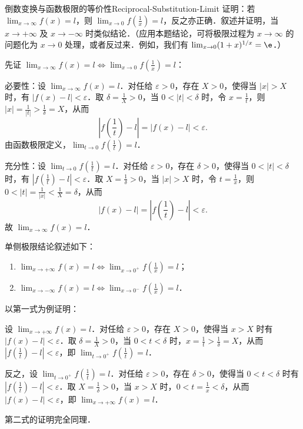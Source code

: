 \begin{problem}{倒数变换与函数极限的等价性}{Reciprocal-Substitution-Limit}
    证明：若 $\lim_{x\to\infty} f(x) = l$，则 $\lim_{x\to 0} f\left(\frac{1}{x}\right) = l$，反之亦正确．叙述并证明，当 $x \to +\infty$ 及 $x \to -\infty$ 时类似结论．（应用本题结论，可将极限过程为 $x \to \infty$ 的问题化为 $x \to 0$ 处理，或者反过来．例如，我们有 $\lim_{x\to 0}(1+x)^{1/x} = \e$．）
\end{problem}

\begin{myproof}
    先证 $\lim_{x\to\infty} f(x) = l \iff \lim_{x\to 0} f\left(\frac{1}{x}\right) = l$：

    必要性：设 $\lim_{x\to\infty} f(x) = l$．对任给 $\varepsilon > 0$，存在 $X > 0$，使得当 $|x| > X$ 时，有 $|f(x) - l| < \varepsilon$．取 $\delta = \frac{1}{X} > 0$，当 $0 < |t| < \delta$ 时，令 $x = \frac{1}{t}$，则 $|x| = \frac{1}{|t|} > \frac{1}{\delta} = X$，从而
    \begin{equation}
        \left| f\left(\frac{1}{t}\right) - l \right| = |f(x) - l| < \varepsilon.
    \end{equation}
    由函数极限定义，$\lim_{t\to 0} f\left(\frac{1}{t}\right) = l$．

    充分性：设 $\lim_{t\to 0} f\left(\frac{1}{t}\right) = l$．对任给 $\varepsilon > 0$，存在 $\delta > 0$，使得当 $0 < |t| < \delta$ 时，有 $\left| f\left(\frac{1}{t}\right) - l \right| < \varepsilon$．取 $X = \frac{1}{\delta} > 0$，当 $|x| > X$ 时，令 $t = \frac{1}{x}$，则 $0 < |t| = \frac{1}{|x|} < \frac{1}{X} = \delta$，从而
    \begin{equation}
        |f(x) - l| = \left| f\left(\frac{1}{t}\right) - l \right| < \varepsilon.
    \end{equation}
    故 $\lim_{x\to\infty} f(x) = l$．

    单侧极限结论叙述如下：
    \begin{enumerate}
        \item $\lim_{x\to +\infty} f(x) = l \iff \lim_{x\to 0^+} f\left(\frac{1}{x}\right) = l$；
        \item $\lim_{x\to -\infty} f(x) = l \iff \lim_{x\to 0^-} f\left(\frac{1}{x}\right) = l$．
    \end{enumerate}

    以第一式为例证明：

    设 $\lim_{x\to +\infty} f(x) = l$．对任给 $\varepsilon > 0$，存在 $X > 0$，使得当 $x > X$ 时有 $|f(x) - l| < \varepsilon$．取 $\delta = \frac{1}{X} > 0$，当 $0 < t < \delta$ 时，$x = \frac{1}{t} > \frac{1}{\delta} = X$，从而 $\left| f\left(\frac{1}{t}\right) - l \right| < \varepsilon$，即 $\lim_{t\to 0^+} f\left(\frac{1}{t}\right) = l$．

    反之，设 $\lim_{t\to 0^+} f\left(\frac{1}{t}\right) = l$．对任给 $\varepsilon > 0$，存在 $\delta > 0$，使得当 $0 < t < \delta$ 时有 $\left| f\left(\frac{1}{t}\right) - l \right| < \varepsilon$．取 $X = \frac{1}{\delta} > 0$，当 $x > X$ 时，$0 < t = \frac{1}{x} < \delta$，从而 $|f(x) - l| < \varepsilon$，即 $\lim_{x\to +\infty} f(x) = l$．

    第二式的证明完全同理．
\end{myproof}

